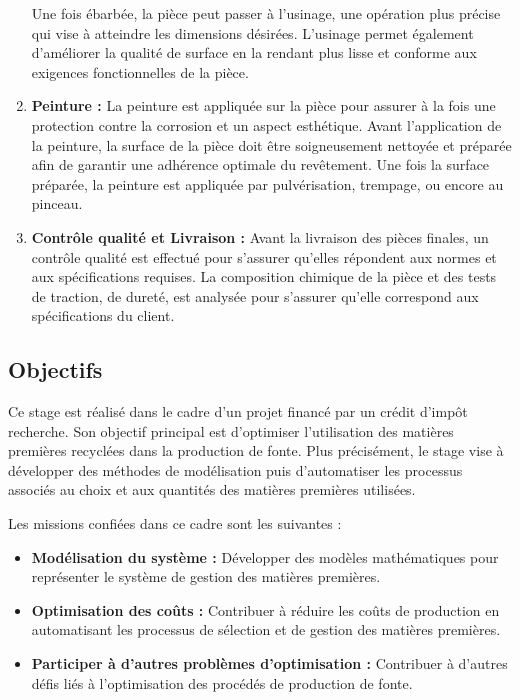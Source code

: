 \documentclass[12pt]{article}
\begin{document}
\begin{enumerate}
    Une fois ébarbée, la pièce peut passer à l'usinage, une opération plus 
    précise qui vise à atteindre les dimensions désirées. L'usinage permet 
    également d'améliorer la qualité de surface en la rendant plus lisse 
    et conforme aux exigences fonctionnelles de la pièce. 

    \item \textbf{Peinture :} La peinture est appliquée sur la pièce pour 
    assurer à la fois une protection contre la corrosion et un aspect 
    esthétique. Avant l'application de la peinture, la surface de la pièce 
    doit être soigneusement nettoyée et préparée afin de garantir une 
    adhérence optimale du revêtement. Une fois la surface préparée, la 
    peinture est appliquée par pulvérisation, trempage, ou encore au 
    pinceau.

    \item \textbf{Contrôle qualité et Livraison :} Avant la livraison des 
    pièces finales, un contrôle qualité est effectué pour s'assurer 
    qu'elles répondent aux normes et aux spécifications requises. La 
    composition chimique de la pièce et des tests de traction, de dureté, est analysée pour 
    s'assurer qu'elle correspond aux spécifications du client. 
\end{enumerate}


\subsection{Objectifs}

Ce stage est réalisé dans le cadre d'un projet financé par un crédit 
d'impôt recherche. Son objectif principal est d'optimiser l'utilisation 
des matières premières recyclées dans la production de fonte. Plus 
précisément, le stage vise à développer des méthodes de modélisation puis 
d'automatiser les processus associés au choix et aux quantités des matières
premières utilisées.

Les missions confiées dans ce cadre sont les suivantes :

\begin{itemize}
\item \textbf{Modélisation du système :} Développer des modèles mathématiques pour représenter le système de gestion des matières premières.
\item \textbf{Optimisation des coûts :} Contribuer à réduire les coûts de production en automatisant les processus de sélection et de gestion des matières premières.
\item \textbf{Participer à d'autres problèmes d'optimisation :} Contribuer à d'autres défis liés à l'optimisation des procédés de production de fonte.
\end{itemize}
\end{document}
